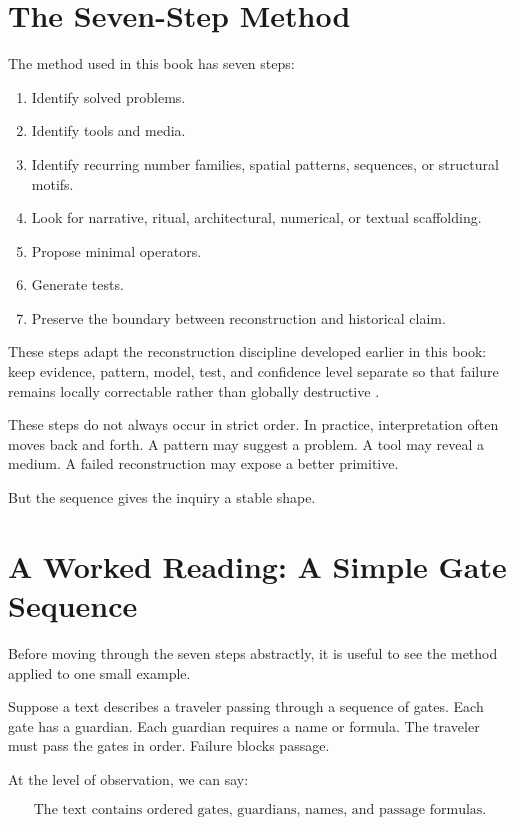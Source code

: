 \documentclass[11pt]{book}
\begin{document}
\section{The Seven-Step Method}

The method used in this book has seven steps:

\begin{enumerate}[label=\arabic*.]
    \item Identify solved problems.
    \item Identify tools and media.
    \item Identify recurring number families, spatial patterns, sequences, or structural motifs.
    \item Look for narrative, ritual, architectural, numerical, or textual scaffolding.
    \item Propose minimal operators.
    \item Generate tests.
    \item Preserve the boundary between reconstruction and historical claim.
\end{enumerate}

These steps adapt the reconstruction discipline developed earlier in this book: keep evidence, pattern, model, test, and confidence level separate so that failure remains locally correctable rather than globally destructive \cite{Cameron2026PMC,Cameron2026IPRP}.

These steps do not always occur in strict order. In practice, interpretation often moves back and forth. A pattern may suggest a problem. A tool may reveal a medium. A failed reconstruction may expose a better primitive.

But the sequence gives the inquiry a stable shape.

\section{A Worked Reading: A Simple Gate Sequence}

Before moving through the seven steps abstractly, it is useful to see the method applied to one small example.

Suppose a text describes a traveler passing through a sequence of gates. Each gate has a guardian. Each guardian requires a name or formula. The traveler must pass the gates in order. Failure blocks passage.

At the level of observation, we can say:

\[
\text{The text contains ordered gates, guardians, names, and passage formulas.}
\]
\end{document}
